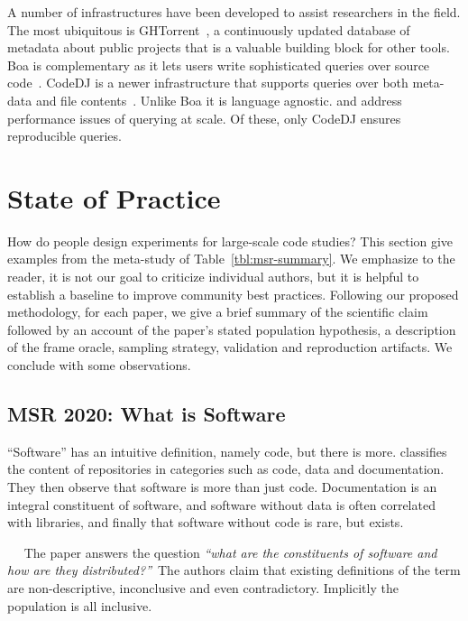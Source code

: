 \documentclass[sigconf,review,anonymous]{acmart}
\newcommand{\ght}{{GHTorrent}\xspace}
\renewcommand{\dj}{{\textsf{Code{\small{DJ}}}}\xspace}
\begin{document}
 A number of infrastructures have been developed to
assist researchers in the field. The most ubiquitous is
\ght~\cite{Gousios:2012}, a continuously updated database of metadata about
public projects that is a valuable building block for other tools. Boa is
complementary as it lets users write sophisticated queries over source
code~\cite{Boa:2013}. \dj is a newer infrastructure that supports queries over
both meta-data and file contents~\cite{ecoop21}. Unlike Boa it is language
agnostic. \citet{ma21} and \citet{Mattis:2020:ACM} address performance issues of
querying at scale. Of these, only \dj ensures reproducible queries.

\section{State of Practice}

How do people design experiments for large-scale code studies? This section give
examples from the meta-study of Table~\ref{tbl:msr-summary}. We emphasize to the
reader, it is not our goal to criticize individual authors, but it is helpful to
establish a baseline to improve community best practices. Following our proposed
methodology, for each paper, we give a brief summary of the scientific claim
followed by an account of the paper's stated population hypothesis, a
description of the frame oracle, sampling strategy, validation and reproduction
artifacts. We conclude with some observations.

\renewcommand{\P}[1]{\vspace{1mm}\noindent{\it\underline{#1}}~~}

\newpage

\subsection{MSR 2020: What is Software}

``Software'' has an intuitive definition, namely code, but there is more.
\citet{Pfeiffer20} classifies the content of repositories in categories such as
code, data and documentation. They then observe that software is more than just
code. Documentation is an integral constituent of software, and software without
data is often correlated with libraries, and finally that software without code
is rare, but exists.

\P{Population Hypothesis:} The paper answers the question {\it ``what are the
  constituents of software and how are they distributed?''\,} The authors claim
that existing definitions of the term are non-descriptive, inconclusive and even
contradictory. Implicitly the population is all inclusive.
\end{document}
